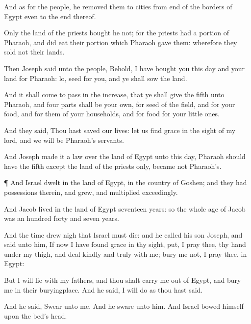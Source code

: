 {And as for the
people, he
removed them to
cities from
{}
end of the
borders of
Egypt even to the
{}
end thereof.

Only the
land of the
priests bought
he not; for the
priests had a
portion
{} of
Pharaoh, and did
eat their
portion which
Pharaoh
gave them: wherefore they
sold not their
lands.

Then
Joseph
said unto the
people, Behold, I have
bought you this
day and your
land for
Pharaoh:
lo,
{}
seed for you, and ye shall
sow the
land.

And it shall come to pass in the
increase, that ye shall
give the
fifth
{} unto
Pharaoh, and
four
parts shall be your own, for
seed of the
field, and for your
food, and for them of your
households, and for
food for your little
ones.

And they
said, Thou hast saved our
lives: let us
find
grace in the
sight of my
lord, and we will be
Pharaoh’s
servants.

And
Joseph
made it a
law over the
land of
Egypt unto this
day,
{}
Pharaoh should have the
fifth
{}
except the
land of the
priests only,
{} became not
Pharaoh’s.


\par }{\PP {}¶ And
Israel
dwelt in the
land of
Egypt, in the
country of
Goshen; and they had
possessions therein, and
grew, and
multiplied
exceedingly.

And
Jacob
lived in the
land of
Egypt
seventeen
years: so the whole
age of
Jacob was an
hundred
forty and
seven
years.

And the
time drew
nigh that
Israel must
die: and he
called his
son
Joseph, and
said unto him, If now I have
found
grace in thy
sight,
put, I pray thee, thy
hand under my
thigh, and
deal
kindly and
truly with me;
bury me not, I pray thee, in
Egypt:

But I will
lie with my
fathers, and thou shalt
carry me out of
Egypt, and
bury me in their
buryingplace. And he
said, I will
do as thou hast
said.

And he
said,
Swear unto me. And he
sware unto him. And
Israel
bowed himself upon the
bed’s
head.




\par }
